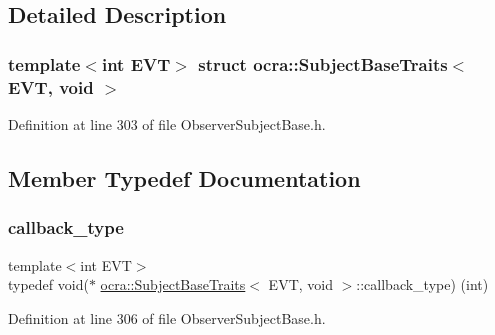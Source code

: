 \subsection{Detailed Description}
\subsubsection*{template$<$int E\+VT$>$\newline
struct ocra\+::\+Subject\+Base\+Traits$<$ E\+V\+T, void $>$}



Definition at line 303 of file Observer\+Subject\+Base.\+h.



\subsection{Member Typedef Documentation}
\hypertarget{structocra_1_1SubjectBaseTraits_3_01EVT_00_01void_01_4_a805e01034816edb44ee4269aba6c5beb}{}\label{structocra_1_1SubjectBaseTraits_3_01EVT_00_01void_01_4_a805e01034816edb44ee4269aba6c5beb} 
\subsubsection{\texorpdfstring{callback\+\_\+type}{callback\_type}}
{\footnotesize\ttfamily template$<$int E\+VT$>$ \\
typedef void($\ast$ \hyperlink{structocra_1_1SubjectBaseTraits}{ocra\+::\+Subject\+Base\+Traits}$<$ E\+VT, void $>$\+::callback\+\_\+type) (int)}



Definition at line 306 of file Observer\+Subject\+Base.\+h.

\hypertarget{structocra_1_1SubjectBaseTraits_3_01EVT_00_01void_01_4_a28d0e1b20cde0e239218e2ef724502b1}{}\label{structocra_1_1SubjectBaseTraits_3_01EVT_00_01void_01_4_a28d0e1b20cde0e239218e2ef724502b1} 
